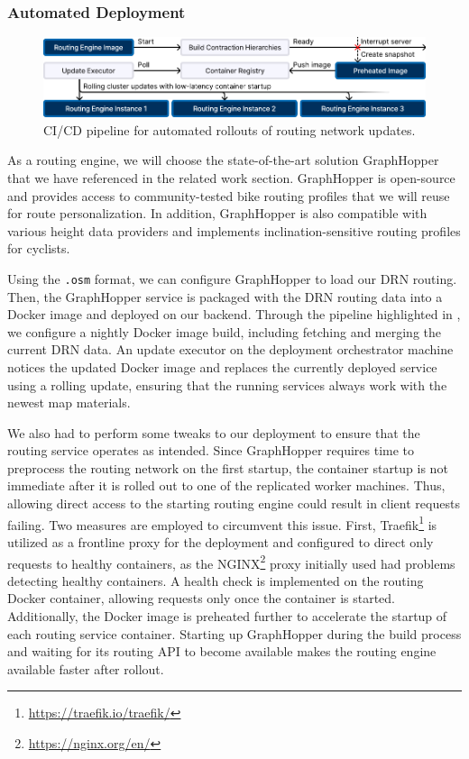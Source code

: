 \subsubsection{Automated Deployment}

\begin{figure}[b]
\centering
\includegraphics[width=\linewidth]{images/load-distribution-containerization-preheating.pdf}
\caption{CI/CD pipeline for automated rollouts of routing network updates.}
\label{fig:multi-stage-continuous-deployment}
\end{figure}

As a routing engine, we will choose the state-of-the-art solution GraphHopper that we have referenced in the related work section. GraphHopper is open-source and provides access to community-tested bike routing profiles that we will reuse for route personalization. In addition, GraphHopper is also compatible with various height data providers and implements inclination-sensitive routing profiles for cyclists. 

Using the \texttt{.osm} format, we can configure GraphHopper to load our DRN routing. Then, the GraphHopper service is packaged with the DRN routing data into a Docker image and deployed on our backend. Through the pipeline highlighted in , we configure a nightly Docker image build, including fetching and merging the current DRN data. An update executor on the deployment orchestrator machine notices the updated Docker image and replaces the currently deployed service using a rolling update, ensuring that the running services always work with the newest map materials. 

We also had to perform some tweaks to our deployment to ensure that the routing service operates as intended. Since GraphHopper requires time to preprocess the routing network on the first startup, the container startup is not immediate after it is rolled out to one of the replicated worker machines. Thus, allowing direct access to the starting routing engine could result in client requests failing. Two measures are employed to circumvent this issue. First, Traefik\footnote{\url{https://traefik.io/traefik/}} is utilized as a frontline proxy for the deployment and configured to direct only requests to healthy containers, as the NGINX\footnote{\url{https://nginx.org/en/}} proxy initially used had problems detecting healthy containers. A health check is implemented on the routing Docker container, allowing requests only once the container is started. Additionally, the Docker image is preheated further to accelerate the startup of each routing service container. Starting up GraphHopper during the build process and waiting for its routing API to become available makes the routing engine available faster after rollout.

